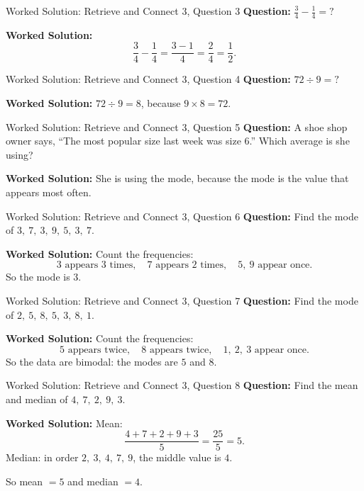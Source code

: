 \documentclass{beamer}
\begin{document}
\begin{frame}{Worked Solution: Retrieve and Connect 3, Question 3}
\small
\textbf{Question:} \(\frac34-\frac14=\mathord{?}\)

\smallskip
\textbf{Worked Solution:}
\[
\frac34-\frac14=\frac{3-1}{4}=\frac24=\frac12.
\]
\end{frame}

\begin{frame}{Worked Solution: Retrieve and Connect 3, Question 4}
\small
\textbf{Question:} \(72 \div 9=\mathord{?}\)

\smallskip
\textbf{Worked Solution:} \(72 \div 9 = 8\), because \(9 \times 8 = 72\).
\end{frame}

\begin{frame}{Worked Solution: Retrieve and Connect 3, Question 5}
\small
\textbf{Question:} A shoe shop owner says, ``The most popular size last week was size 6.'' Which average is she using?

\smallskip
\textbf{Worked Solution:} She is using the mode, because the mode is the value that appears most often.
\end{frame}

\begin{frame}{Worked Solution: Retrieve and Connect 3, Question 6}
\small
\textbf{Question:} Find the mode of \(3,\ 7,\ 3,\ 9,\ 5,\ 3,\ 7\).

\smallskip
\textbf{Worked Solution:} Count the frequencies:
\[
3\text{ appears }3\text{ times},\quad 7\text{ appears }2\text{ times},\quad 5,\ 9\text{ appear once}.
\]
So the mode is \(3\).
\end{frame}

\begin{frame}{Worked Solution: Retrieve and Connect 3, Question 7}
\small
\textbf{Question:} Find the mode of \(2,\ 5,\ 8,\ 5,\ 3,\ 8,\ 1\).

\smallskip
\textbf{Worked Solution:} Count the frequencies:
\[
5\text{ appears twice},\quad 8\text{ appears twice},\quad 1,\ 2,\ 3\text{ appear once}.
\]
So the data are bimodal: the modes are \(5\) and \(8\).
\end{frame}

\begin{frame}{Worked Solution: Retrieve and Connect 3, Question 8}
\small
\textbf{Question:} Find the mean and median of \(4,\ 7,\ 2,\ 9,\ 3\).

\smallskip
\textbf{Worked Solution:} Mean:
\[
\frac{4+7+2+9+3}{5}=\frac{25}{5}=5.
\]
Median: in order \(2,\ 3,\ 4,\ 7,\ 9\), the middle value is \(4\).

So mean \(=5\) and median \(=4\).
\end{frame}
\end{document}
